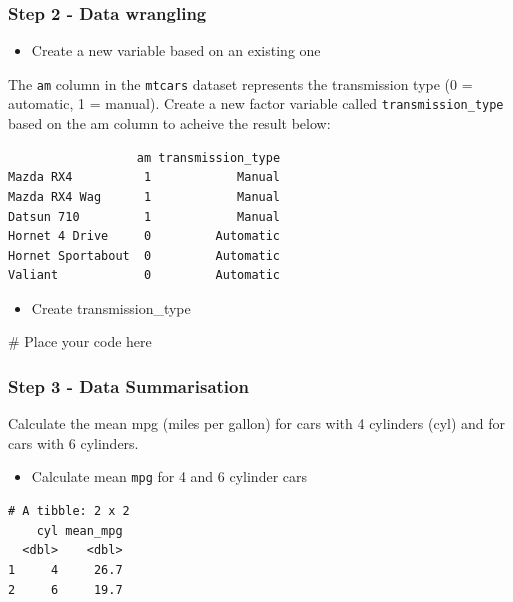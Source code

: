 \documentclass[
  letterpaper,
  DIV=11,
  numbers=noendperiod]{scrartcl}
\newenvironment{Shaded}{\begin{snugshade}}{\end{snugshade}}
\newcommand{\CommentTok}[1]{\textcolor[rgb]{0.37,0.37,0.37}{#1}}
\providecommand{\tightlist}{%
  \setlength{\itemsep}{0pt}\setlength{\parskip}{0pt}}
\begin{document}
\subsubsection{Step 2 - Data wrangling}\label{step-2---data-wrangling}

\begin{itemize}
\tightlist
\item
  Create a new variable based on an existing one
\end{itemize}

The \texttt{am} column in the \texttt{mtcars} dataset represents the
transmission type (0 = automatic, 1 = manual). Create a new factor
variable called \texttt{transmission\_type} based on the am column to
acheive the result below:

\begin{verbatim}
                  am transmission_type
Mazda RX4          1            Manual
Mazda RX4 Wag      1            Manual
Datsun 710         1            Manual
Hornet 4 Drive     0         Automatic
Hornet Sportabout  0         Automatic
Valiant            0         Automatic
\end{verbatim}

\begin{itemize}
\tightlist
\item
  Create transmission\_type
\end{itemize}

\begin{Shaded}
\begin{Highlighting}[]
\CommentTok{\# Place your code here}
\end{Highlighting}
\end{Shaded}

\subsubsection{Step 3 - Data
Summarisation}\label{step-3---data-summarisation}

Calculate the mean mpg (miles per gallon) for cars with 4 cylinders
(cyl) and for cars with 6 cylinders.

\begin{itemize}
\tightlist
\item
  Calculate mean \texttt{mpg} for 4 and 6 cylinder cars
\end{itemize}

\begin{verbatim}
# A tibble: 2 x 2
    cyl mean_mpg
  <dbl>    <dbl>
1     4     26.7
2     6     19.7
\end{verbatim}
\end{document}
